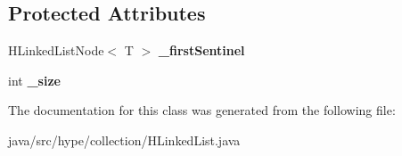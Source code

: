 \subsection*{Protected Attributes}
\begin{DoxyCompactItemize}
\item 
\hypertarget{classhype_1_1collection_1_1_h_linked_list_3_01_t_01_4_adb6814ff86b4735d216f177b2a254614}{H\-Linked\-List\-Node$<$ T $>$ {\bfseries \-\_\-first\-Sentinel}}\label{classhype_1_1collection_1_1_h_linked_list_3_01_t_01_4_adb6814ff86b4735d216f177b2a254614}

\item 
\hypertarget{classhype_1_1collection_1_1_h_linked_list_3_01_t_01_4_aeaf64c6da6823f7b2d1c868b77f4e19a}{int {\bfseries \-\_\-size}}\label{classhype_1_1collection_1_1_h_linked_list_3_01_t_01_4_aeaf64c6da6823f7b2d1c868b77f4e19a}

\end{DoxyCompactItemize}


The documentation for this class was generated from the following file\-:\begin{DoxyCompactItemize}
\item 
java/src/hype/collection/H\-Linked\-List.\-java\end{DoxyCompactItemize}
